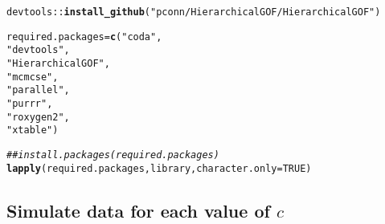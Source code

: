 \documentclass[12pt,letterpaper,final]{article}\usepackage[]{graphicx}\usepackage[]{color}
\makeatletter
\newcommand{\hlnum}[1]{\textcolor[rgb]{0.686,0.059,0.569}{#1}}%
\newcommand{\hlstr}[1]{\textcolor[rgb]{0.192,0.494,0.8}{#1}}%
\newcommand{\hlcom}[1]{\textcolor[rgb]{0.678,0.584,0.686}{\textit{#1}}}%
\newcommand{\hlopt}[1]{\textcolor[rgb]{0,0,0}{#1}}%
\newcommand{\hlstd}[1]{\textcolor[rgb]{0.345,0.345,0.345}{#1}}%
\newcommand{\hlkwb}[1]{\textcolor[rgb]{0.69,0.353,0.396}{#1}}%
\newcommand{\hlkwc}[1]{\textcolor[rgb]{0.333,0.667,0.333}{#1}}%
\newcommand{\hlkwd}[1]{\textcolor[rgb]{0.737,0.353,0.396}{\textbf{#1}}}%
\newenvironment{kframe}{%
 \def\at@end@of@kframe{}%
 \ifinner\ifhmode%
  \def\at@end@of@kframe{\end{minipage}}%
  \begin{minipage}{\columnwidth}%
 \fi\fi%
 \def\FrameCommand##1{\hskip\@totalleftmargin \hskip-\fboxsep
 \colorbox{shadecolor}{##1}\hskip-\fboxsep
     \hskip-\linewidth \hskip-\@totalleftmargin \hskip\columnwidth}%
 \MakeFramed {\advance\hsize-\width
   \@totalleftmargin\z@ \linewidth\hsize
   \@setminipage}}%
 {\par\unskip\endMakeFramed%
 \at@end@of@kframe}
\newenvironment{knitrout}{}{} %
\makeatother
\begin{document}
\begin{knitrout}
\color{fgcolor}\begin{kframe}
\begin{alltt}
\hlstd{devtools}\hlopt{::}\hlkwd{install_github}\hlstd{(}\hlstr{"pconn/HierarchicalGOF/HierarchicalGOF"}\hlstd{)}

\hlstd{required.packages}\hlkwb{=}\hlkwd{c}\hlstd{(}\hlstr{"coda"}\hlstd{,}
                    \hlstr{"devtools"}\hlstd{,}
                    \hlstr{"HierarchicalGOF"}\hlstd{,}
                    \hlstr{"mcmcse"}\hlstd{,}
                    \hlstr{"parallel"}\hlstd{,}
                    \hlstr{"purrr"}\hlstd{,}
                    \hlstr{"roxygen2"}\hlstd{,}
                    \hlstr{"xtable"} \hlstd{)}

\hlcom{## install.packages(required.packages)}
\hlkwd{lapply}\hlstd{(required.packages,library,}\hlkwc{character.only}\hlstd{=}\hlnum{TRUE}\hlstd{)}
\end{alltt}
\end{kframe}
\end{knitrout}

\subsection{Simulate data for each value of $c$}
\end{document}
